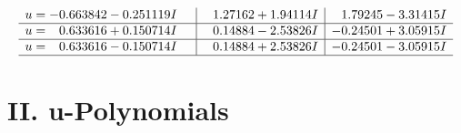 \documentclass[1p]{elsarticle_modified}
\theoremstyle{definition}
\begin{document}
$$\begin{array}{c|c|c}
\begin{aligned}
u &= -0.663842 - 0.251119 I\end{aligned}
 & \phantom{-}1.27162 + 1.94114 I & \phantom{-}1.79245 - 3.31415 I \\ \hline\begin{aligned}
u &= \phantom{-}0.633616 + 0.150714 I\end{aligned}
 & \phantom{-}0.14884 - 2.53826 I & -0.24501 + 3.05915 I \\ \hline\begin{aligned}
u &= \phantom{-}0.633616 - 0.150714 I\end{aligned}
 & \phantom{-}0.14884 + 2.53826 I & -0.24501 - 3.05915 I\\
 \hline 
 \end{array}$$\newpage
\newpage\renewcommand{\arraystretch}{1}
\centering \section*{ II. u-Polynomials}
\end{document}
